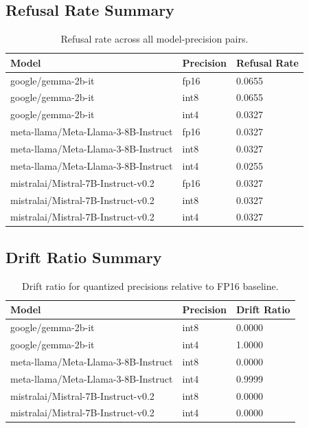 \documentclass[11pt]{article}
\begin{document}
\subsection{Refusal Rate Summary}
\begin{table}[H]
\centering
\begin{tabular}{lll}
\toprule
Model & Precision & Refusal Rate \\
\midrule
google/gemma-2b-it & fp16 & 0.0655 \\
google/gemma-2b-it & int8 & 0.0655 \\
google/gemma-2b-it & int4 & 0.0327 \\
meta-llama/Meta-Llama-3-8B-Instruct & fp16 & 0.0327 \\
meta-llama/Meta-Llama-3-8B-Instruct & int8 & 0.0327 \\
meta-llama/Meta-Llama-3-8B-Instruct & int4 & 0.0255 \\
mistralai/Mistral-7B-Instruct-v0.2 & fp16 & 0.0327 \\
mistralai/Mistral-7B-Instruct-v0.2 & int8 & 0.0327 \\
mistralai/Mistral-7B-Instruct-v0.2 & int4 & 0.0327 \\
\bottomrule
\end{tabular}
\caption{Refusal rate across all model-precision pairs.}
\label{tab:refusal}
\end{table}

\subsection{Drift Ratio Summary}
\begin{table}[H]
\centering
\begin{tabular}{lll}
\toprule
Model & Precision & Drift Ratio \\
\midrule
google/gemma-2b-it & int8 & 0.0000 \\
google/gemma-2b-it & int4 & 1.0000 \\
meta-llama/Meta-Llama-3-8B-Instruct & int8 & 0.0000 \\
meta-llama/Meta-Llama-3-8B-Instruct & int4 & 0.9999 \\
mistralai/Mistral-7B-Instruct-v0.2 & int8 & 0.0000 \\
mistralai/Mistral-7B-Instruct-v0.2 & int4 & 0.0000 \\
\bottomrule
\end{tabular}
\caption{Drift ratio for quantized precisions relative to FP16 baseline.}
\label{tab:drift}
\end{table}
\end{document}

